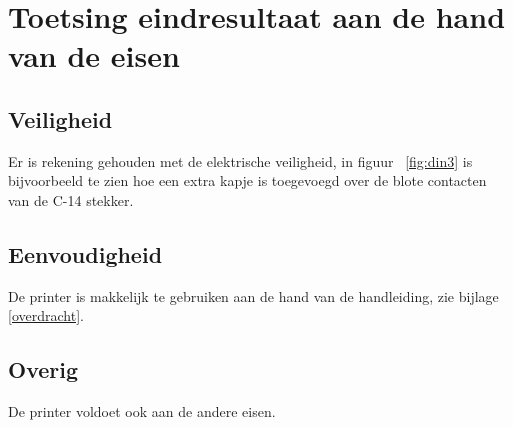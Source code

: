 \chapter{Toetsing eindresultaat aan de hand van de eisen}
\label{Toetsing_eindresultaat_aan_de_hand_van_de_eisen}

\section{Veiligheid}

Er is rekening gehouden met de elektrische veiligheid, in figuur
~\ref{fig:din3} is bijvoorbeeld te zien hoe een extra kapje is toegevoegd over
de blote contacten van de C-14 stekker.

\section{Eenvoudigheid}

De printer is makkelijk te gebruiken aan de hand van de handleiding, zie bijlage \ref{overdracht}.

\section{Overig}

De printer voldoet ook aan de andere eisen.

